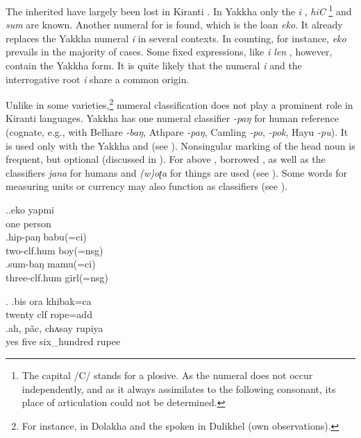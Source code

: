 The inherited   have largely been lost in Kiranti \citep{Ebert1994The-structure}. In Yakkha only the  \emph{i} , \emph{hiC} \footnote{The capital /C/ stands for a plosive. As the numeral does not occur independently, and as it always assimilates to the following consonant, its place of articulation could not be determined.} and \emph{sum}  are known. Another  numeral for  is found, which is the  loan \emph{eko}. It already replaces the Yakkha numeral \emph{i} in several contexts. In counting, for instance,  \emph{eko} prevails in the majority of cases. Some fixed expressions, like \emph{i len} , however, contain the Yakkha form. It is quite likely  that the numeral \emph{i} and the interrogative root \emph{i} share a common origin.

Unlike in some  varieties,\footnote{For instance, in Dolakha  \citep[220]{Genetti2007_Newari} and the  spoken in Dulikhel (own observations).} numeral classification does not play a prominent role in Kiranti languages. Yakkha has one numeral classifier \emph{-paŋ} for human reference (cognate, e.g., with Belhare \emph{-baŋ}, Athpare \emph{-paŋ}, Camling \emph{-po},  \emph{-pok}, Hayu \emph{-pu}). It is  used only with the Yakkha   and   (see \Next).  Nonsingular marking of the head noun is frequent, but optional (discussed in  ). For  above ,  borrowed  , as well as the  classifiers \emph{jana} for humans and \emph{(w)oʈa} for things are used (see \NNext[a]). Some words for measuring units or currency may also function as classifiers (see \NNext[b]).  

\ex.\ag.eko yapmi\\
one person\\
\bg.hip-paŋ babu(=ci)\\
two{\sc -clf.hum} boy({\sc =nsg})\\
\bg.sum-baŋ mamu(=ci)\\
three{\sc -clf.hum} girl({\sc =nsg})\\

\ex. \ag.bis ora  khibak=ca\\
twenty {\sc clf}  rope{\sc =add}\\
 
\bg.ah,    pãc, chʌsay     rupiya\\
yes five six\_hundred rupee\\
 

